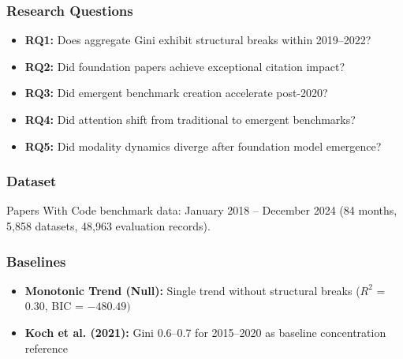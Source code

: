 
\subsubsection{Research Questions}

\begin{itemize}
\item \textbf{RQ1:} Does aggregate Gini exhibit structural breaks within 2019--2022?
\item \textbf{RQ2:} Did foundation papers achieve exceptional citation impact?
\item \textbf{RQ3:} Did emergent benchmark creation accelerate post-2020?
\item \textbf{RQ4:} Did attention shift from traditional to emergent benchmarks?
\item \textbf{RQ5:} Did modality dynamics diverge after foundation model emergence?
\end{itemize}

\subsubsection{Dataset}

Papers With Code benchmark data: January 2018 -- December 2024 (84 months, 5,858 datasets, 48,963 evaluation records).

\subsubsection{Baselines}

\begin{itemize}
\item \textbf{Monotonic Trend (Null):} Single trend without structural breaks ($R^2$ = 0.30, BIC = $-480.49)$
\item \textbf{Koch et al. (2021):} Gini 0.6--0.7 for 2015--2020 as baseline concentration reference
\end{itemize}
